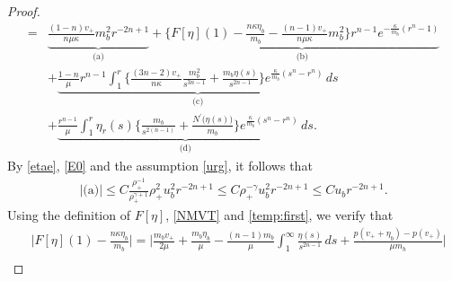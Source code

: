 \documentclass[a4paper,12pt,draft]{article}
\theoremstyle{remark}
\begin{document}
\begin{proof}
\begin{align}
        =& \underbrace{\frac{(1-n)v_{+}}{n\mu \kappa} m_b^2 r^{-2n+1}}_{\textrm{(a)}} + \underbrace{\Big\{ F[\eta](1) - \frac{n\kappa \eta_b}{m_b} - \frac{(n-1)v_{+}}{n\mu\kappa}m_b^2 \Big\} r^{n-1} e^{-\frac{\kappa}{m_b}(r^n-1)}}_{\textrm{(b)}}\nonumber\\
        &+ \underbrace{\frac{1-n}{\mu} r^{n-1} \int_{1}^{r} \Big\{ \frac{(3n-2)v_{+}}{n\kappa} \frac{m_b^2}{s^{3n-1}} + \frac{m_b \eta(s)}{s^{2n-1}} \Big\} e^{\frac{\kappa}{m_b}(s^n-r^n)}\, ds}_{\textrm{(c)}}  \nonumber\\
        & + \underbrace{\frac{r^{n-1}}{\mu} \int_{1}^r\!\! \eta_r(s) \Big\{ \frac{m_b}{s^{2(n-1)}} + \frac{N^{\prime}\big(\eta(s)\big)}{m_b} \Big\}  e^{\frac{\kappa}{m_b}(s^n-r^n)}  \,ds}_{\textrm{(d)}}. \label{er-long}
    \end{align}
    By \eqref{etae}, \eqref{E0} and the assumption \eqref{urg}, it follows that
    \begin{align*}
        |\textrm{(a)}| \le C \frac{\rho_{+}^{-1}}{\rho_{+}^{\gamma+1}} \rho_{+}^2 u_b^2 r^{-2n+1} 
        \le C \rho_{+}^{-\gamma} u_b^2 r^{-2n+1} \le C u_b r^{-2n+1}.
    \end{align*}
    Using the definition of $F[\eta]$, \eqref{NMVT} and \eqref{temp:first}, we verify that
    \begin{align*}
        &\Big|F[\eta](1)-\frac{n\kappa \eta_b}{m_b}\Big|=\bigg|\frac{m_b v_{+}}{2\mu}+\frac{m_b \eta_b}{\mu}-\frac{(n-1)m_b}{\mu}\int_{1}^{\infty}\frac{\eta(s)}{s^{2n-1}}\,ds + \frac{p(v_{+}+\eta_b)-p(v_{+})}{\mu m_b}\bigg|\\

\end{align*}
\end{proof}
\end{document}
